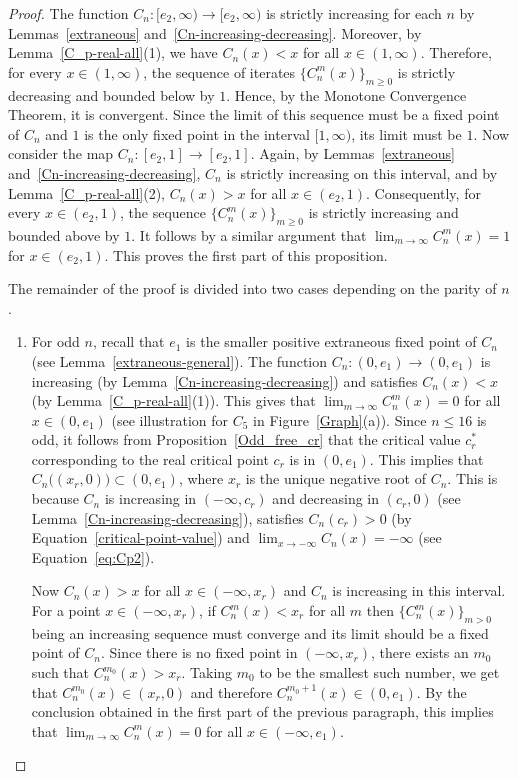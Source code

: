 \documentclass[12pt]{article}
\begin{document}
 \begin{proof} 	
 	The function $C_n:[e_2,\infty) \to [e_2,\infty)$ is strictly increasing for each $n$ by Lemmas~\ref{extraneous} and~\ref{Cn-increasing-decreasing}. Moreover, by Lemma~\ref{C_p-real-all}(1), we have $C_n(x)<x$ for all $x\in (1,\infty)$. Therefore, for every $x \in (1,\infty)$, the sequence of iterates $\{C_n^m(x)\}_{m \geq 0}$ is strictly decreasing and bounded below by $1$. Hence, by the Monotone Convergence Theorem, it is convergent. Since the limit of this sequence must be a fixed point of $C_n$ and $1$ is the only fixed point in the interval $[1,\infty)$, its limit must be $1$. Now consider the map $C_n:[e_2,1] \to [e_2,1]$. Again, by Lemmas~\ref{extraneous} and~\ref{Cn-increasing-decreasing}, $C_n$ is strictly increasing on this interval, and by Lemma~\ref{C_p-real-all}(2), $C_n (x) >x$ for all $ x \in (e_2, 1)$. Consequently, for every $x \in (e_2, 1)$, the sequence $\{C_n^m(x)\}_{m \geq 0}$ is strictly increasing and bounded above by $1$. It follows by a similar argument that  $\lim_{m \to \infty} C_n ^m (x)= 1$ for $x \in (e_2, 1)$. This proves the first part of this proposition.
 
    The remainder of the proof is divided into two cases depending on the parity of $n$.
	\begin{enumerate}
		\item For odd $n$, recall that $e_1$ is the smaller positive extraneous fixed point of $C_n$ (see Lemma~\ref{extraneous-general}). 
		The function $C_n : (0, e_1) \to (0, e_1)$ is increasing (by Lemma~\ref{Cn-increasing-decreasing}) and satisfies $C_n (x) <x$ (by Lemma~\ref{C_p-real-all}(1)). This gives that $\lim_{m \to \infty} C_n ^m (x)=0$ for all $x \in (0,e_1)$ (see illustration for $C_5$ in Figure~\ref{Graph}(a)). 
		Since $n \leq 16 $ is odd, it follows from Proposition~\ref{Odd_free_cr} that the critical value $c_r^{*} $ corresponding to the real critical point $c_r$ is in $(0,e_{1})$. This implies that $C_{n}\big((x_r ,0)\big) \subset  (0, e_1)$, where $x_r$ is the unique negative root of $C_n$. This is because $C_n$ is increasing in $(-\infty, c_r)$ and decreasing in $(c_r, 0)$ (see Lemma~\ref{Cn-increasing-decreasing}), satisfies  $C_n (c_r)>0$ (by Equation~\eqref{critical-point-value}) and $\lim_{x \to -\infty}C_n (x) = -\infty$ (see Equation~\eqref{eq:Cp2}). 
		\par Now  $C_{n}(x) > x$ for all $x \in (-\infty, x_r)$ and $C_n$ is increasing in this interval. For  a point $x \in (-\infty, x_r)$, if $C_n ^m (x)< x_r$ for all $m$ then $\{C_n ^m(x)\}_{m >0}$ being an increasing sequence must converge and its limit should be a fixed point of $C_n$. Since there is no fixed point in $(-\infty, x_r)$, there exists an $m_0$  such that $C_n ^{m_0}(x) > x_r$. Taking $m_0$ to be the smallest such number, we get that $C_n ^{m_0}(x) \in (x_r, 0)$ and therefore $C_n ^{m_0+1}(x) \in (0, e_1)$. By the conclusion obtained in the first part of the previous paragraph, this implies that $\lim_{m \to \infty} C_n ^m (x)= 0$ for all $x \in (-\infty, e_1)$. 
			

\end{enumerate}
\end{proof}
\end{document}
